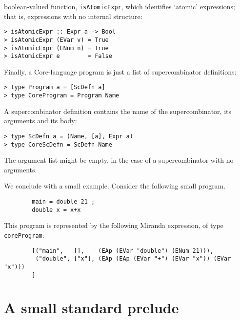 boolean-valued function, \mbox{\tt isAtomicExpr},
which identifies `atomic' expressions; that is,
expressions with no internal structure:
\begin{verbatim}
> isAtomicExpr :: Expr a -> Bool
> isAtomicExpr (EVar v) = True
> isAtomicExpr (ENum n) = True
> isAtomicExpr e        = False
\end{verbatim}
%
%
%
%
Finally, a Core-language
program is just a list of supercombinator definitions:
\begin{verbatim}
> type Program a = [ScDefn a]
> type CoreProgram = Program Name
\end{verbatim}
%
%
A supercombinator definition contains the name of the supercombinator,
its arguments and its body:
\begin{verbatim}
> type ScDefn a = (Name, [a], Expr a)
> type CoreScDefn = ScDefn Name
\end{verbatim}
%
%
The argument list might be empty, in the case of a supercombinator
with no arguments.

We conclude with a small example. Consider the following small program.
\begin{verbatim}
        main = double 21 ;
        double x = x+x
\end{verbatim}
This program is represented by the following Miranda expression, of type
\mbox{\tt coreProgram}:
\begin{verbatim}
        [("main",   [],    (EAp (EVar "double") (ENum 21))),
         ("double", ["x"], (EAp (EAp (EVar "+") (EVar "x")) (EVar "x")))
        ]
\end{verbatim}


\section{A small standard prelude}
\label{sect:prelude}

